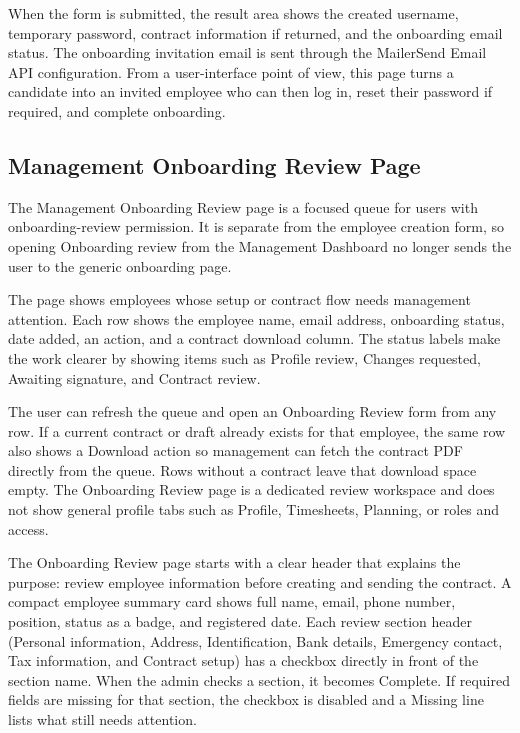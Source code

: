 \documentclass[11pt]{article}
\begin{document}
When the form is submitted, the result area shows the created username, temporary password, contract information if returned, and the onboarding email status. The onboarding invitation email is sent through the MailerSend Email API configuration. From a user-interface point of view, this page turns a candidate into an invited employee who can then log in, reset their password if required, and complete onboarding.
\subsection{Management Onboarding Review Page}

The Management Onboarding Review page is a focused queue for users with onboarding-review permission. It is separate from the employee creation form, so opening Onboarding review from the Management Dashboard no longer sends the user to the generic onboarding page.

The page shows employees whose setup or contract flow needs management attention. Each row shows the employee name, email address, onboarding status, date added, an action, and a contract download column. The status labels make the work clearer by showing items such as Profile review, Changes requested, Awaiting signature, and Contract review.

The user can refresh the queue and open an Onboarding Review form from any row. If a current contract or draft already exists for that employee, the same row also shows a Download action so management can fetch the contract PDF directly from the queue. Rows without a contract leave that download space empty. The Onboarding Review page is a dedicated review workspace and does not show general profile tabs such as Profile, Timesheets, Planning, or roles and access.

The Onboarding Review page starts with a clear header that explains the purpose: review employee information before creating and sending the contract. A compact employee summary card shows full name, email, phone number, position, status as a badge, and registered date. Each review section header (Personal information, Address, Identification, Bank details, Emergency contact, Tax information, and Contract setup) has a checkbox directly in front of the section name. When the admin checks a section, it becomes Complete. If required fields are missing for that section, the checkbox is disabled and a Missing line lists what still needs attention.
\end{document}

